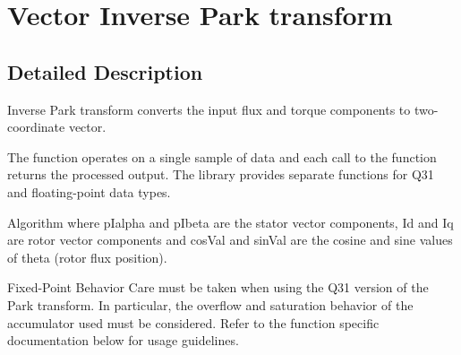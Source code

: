 \hypertarget{group__inv__park}{\section{Vector Inverse Park transform}
\label{group__inv__park}
}


\subsection{Detailed Description}
Inverse Park transform converts the input flux and torque components to two-\/coordinate vector.

The function operates on a single sample of data and each call to the function returns the processed output. The library provides separate functions for Q31 and floating-\/point data types. \begin{DoxyParagraph}{Algorithm}
 where {\ttfamily p\-Ialpha} and {\ttfamily p\-Ibeta} are the stator vector components, {\ttfamily Id} and {\ttfamily Iq} are rotor vector components and {\ttfamily cos\-Val} and {\ttfamily sin\-Val} are the cosine and sine values of theta (rotor flux position). 
\end{DoxyParagraph}
\begin{DoxyParagraph}{Fixed-\/\-Point Behavior}
Care must be taken when using the Q31 version of the Park transform. In particular, the overflow and saturation behavior of the accumulator used must be considered. Refer to the function specific documentation below for usage guidelines. 
\end{DoxyParagraph}
